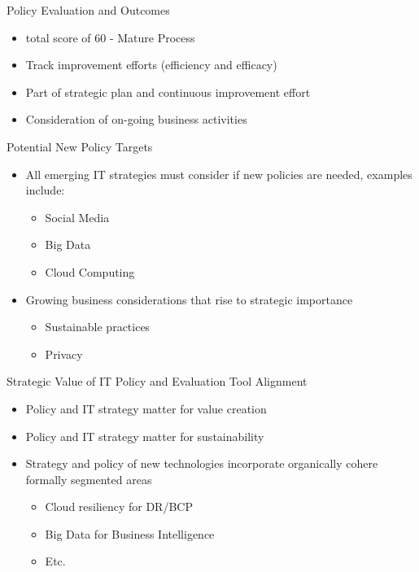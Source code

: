 \documentclass[unknownkeysallowed]{beamer}
\begin{document}
\begin{frame}[label={sec:org714536d}]{Policy Evaluation and Outcomes}
\begin{itemize}
\item<1-> total score of 60 - Mature Process
\item<2-> Track improvement efforts (efficiency and efficacy)
\item<3-> Part of strategic plan and continuous improvement effort
\item<4-> Consideration of on-going business activities
\end{itemize}
\end{frame}


\begin{frame}[label={sec:org40a5eaa}]{Potential New Policy Targets}
\begin{itemize}
\item All emerging IT strategies must consider if new policies are needed, examples include:
\begin{itemize}
\item Social Media \parencite{ashishkumarrathorePolicymakersUseSocial2021}
\item Big Data \parencite{mainaRevisitingNationalEHealth2019}
\item Cloud Computing \parencite{wangResearchDataSecurity2021}
\end{itemize}
\item Growing business considerations that rise to strategic importance
\begin{itemize}
\item Sustainable practices \parencite{choiSustainablePoliciesStrategies2016}
\item Privacy \parencite{bennettRevisitingGovernancePrivacy2020}
\end{itemize}
\end{itemize}
\end{frame}

\begin{frame}[label={sec:org39ffd28}]{Strategic Value of IT Policy and Evaluation Tool Alignment}
\begin{itemize}
\item Policy and IT strategy matter for value creation
\item Policy and IT strategy matter for sustainability \parencite{chanChiefInformationOfficers2021}
\item Strategy and policy of new technologies incorporate organically cohere formally segmented areas
\begin{itemize}
\item Cloud resiliency for DR/BCP \parencite{jasgurLeveragingDisasterRecovery2019}
\item Big Data for Business Intelligence \parencite{zhangApplicationEmergingInformation2020}
\item Etc.
\end{itemize}
\end{itemize}




\appendix
\end{frame}
\end{document}

